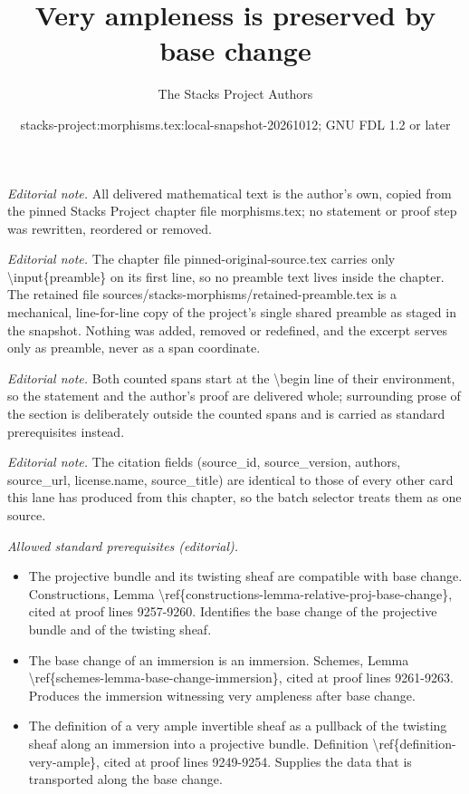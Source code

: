\documentclass[10pt,a4paper]{amsart}
\title{Very ampleness is preserved by base change}
\author{The Stacks Project Authors}
\date{stacks-project:morphisms.tex:local-snapshot-20261012; GNU FDL 1.2 or later}
\theoremstyle{plain}
\theoremstyle{definition}
\theoremstyle{remark}
\numberwithin{equation}{subsection}
\begin{document}
\maketitle
\setcounter{subsection}{1}
\noindent\textit{Editorial note.} All delivered mathematical text is the author's own, copied from the pinned Stacks Project chapter file morphisms.tex; no statement or proof step was rewritten, reordered or removed.\par\medskip
\noindent\textit{Editorial note.} The chapter file pinned-original-source.tex carries only \textbackslash{}input\{preamble\} on its first line, so no preamble text lives inside the chapter. The retained file sources/stacks-morphisms/retained-preamble.tex is a mechanical, line-for-line copy of the project's single shared preamble as staged in the snapshot. Nothing was added, removed or redefined, and the excerpt serves only as preamble, never as a span coordinate.\par\medskip
\noindent\textit{Editorial note.} Both counted spans start at the \textbackslash{}begin line of their environment, so the statement and the author's proof are delivered whole; surrounding prose of the section is deliberately outside the counted spans and is carried as standard prerequisites instead.\par\medskip
\noindent\textit{Editorial note.} The citation fields (source\_id, source\_version, authors, source\_url, license.name, source\_title) are identical to those of every other card this lane has produced from this chapter, so the batch selector treats them as one source.\par\medskip
\noindent\textit{Allowed standard prerequisites (editorial).}\begin{itemize}
\item The projective bundle and its twisting sheaf are compatible with base change. Constructions, Lemma \textbackslash{}ref\{constructions-lemma-relative-proj-base-change\}, cited at proof lines 9257-9260. Identifies the base change of the projective bundle and of the twisting sheaf.
\item The base change of an immersion is an immersion. Schemes, Lemma \textbackslash{}ref\{schemes-lemma-base-change-immersion\}, cited at proof lines 9261-9263. Produces the immersion witnessing very ampleness after base change.
\item The definition of a very ample invertible sheaf as a pullback of the twisting sheaf along an immersion into a projective bundle. Definition \textbackslash{}ref\{definition-very-ample\}, cited at proof lines 9249-9254. Supplies the data that is transported along the base change.
\end{itemize}\medskip
\end{document}

